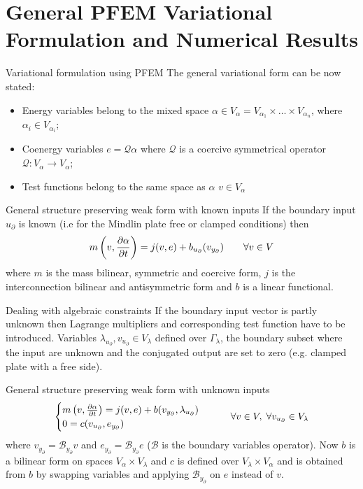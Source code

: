 \documentclass{beamer}
\begin{document}
\section{General PFEM Variational Formulation and Numerical Results}

\begin{frame}{Variational formulation using PFEM}
The general variational form can be now stated:
\begin{itemize}
	\item Energy variables belong to the mixed space $\alpha \in  V_{\alpha} = V_{\alpha_1} \times  \dots \times V_{\alpha_n}$, where $\alpha_i \in V_{\alpha_i}$;
	\item  Coenergy variables $e = \mathcal{Q} \alpha$ where $\mathcal{Q}$ is a coercive symmetrical operator $\mathcal{Q}: V_{\alpha} \rightarrow V_{\alpha}$;
	\item Test functions belong to the same space as $\alpha$ $v \in V_{\alpha}$
\end{itemize}

\begin{block}{General structure preserving weak form with known inputs}
If the boundary input ${u}_\partial$ is known (i.e for the Mindlin plate free or clamped conditions) then
\begin{equation*}
m\left(v, \diffp{\alpha}{t}\right) = j(v,e) + b_{u_\partial}(v_{y_\partial}) \qquad \forall v \in V
\end{equation*}
where $m$ is the mass bilinear, symmetric and coercive form, $j$ is the interconnection bilinear and antisymmetric form and $b$ is a linear functional.
\end{block}


\end{frame}


\begin{frame}{Dealing with algebraic constraints}
If the boundary input vector is partly unknown then Lagrange multipliers and corresponding test function have to be introduced. Variables $\lambda_{u_\partial}, v_{u_\partial} \in V_{\lambda}$ defined over $\Gamma_{\lambda}$, the boundary subset where the input are unknown and the conjugated output are set to zero (e.g. clamped plate with a free side).
\begin{block}{General structure preserving weak form with unknown inputs}
\begin{equation*}
\begin{cases}
m\left(v, \diffp{\alpha}{t}\right) = j(v,e) + b(v_{y_\partial}, \lambda_{u_\partial}) \\
0 = c(v_{u_\partial}, e_{y_\partial})
\end{cases} \qquad \forall v \in V, \; \forall v_{u_\partial} \in V_\lambda
\end{equation*} 
where $v_{y_\partial} = \mathcal{B}_{y_\partial} v$ and $e_{y_\partial} = \mathcal{B}_{y_\partial} e$ ($\mathcal{B}$ is the boundary variables operator). Now $b$ is a bilinear form on spaces $V_{\alpha} \times V_{\lambda}$ and $c$ is defined over $V_{\lambda} \times V_{\alpha}$ and is obtained from $b$ by swapping variables and applying $\mathcal{B}_{y_\partial}$ on $e$ instead of $v$.
\end{block}
\end{frame} 
\end{document}

